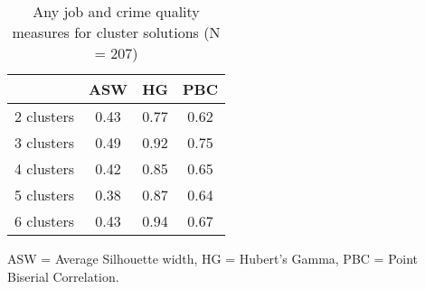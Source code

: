 \begin{table}[htp]
\footnotesize
\setlength{\tabcolsep}{35pt}
\renewcommand{\arraystretch}{1.3}
\begin{threeparttable}
\centering
\caption{Any job and crime quality measures for cluster solutions (N = 207)} 
\label{tab:quality_clusters_anyjob_crime}
\begin{tabular}{lccc}
  \hline
 & ASW & HG & PBC \\ 
  \hline
2 clusters & 0.43 & 0.77 & 0.62 \\ 
  3 clusters & 0.49 & 0.92 & 0.75 \\ 
  4 clusters & 0.42 & 0.85 & 0.65 \\ 
  5 clusters & 0.38 & 0.87 & 0.64 \\ 
  6 clusters & 0.43 & 0.94 & 0.67 \\ 
   \hline
\end{tabular}
\begin{tablenotes}
\scriptsize
\item ASW = Average Silhouette width, HG = Hubert's Gamma, PBC = Point Biserial Correlation.
\end{tablenotes}
\end{threeparttable}
\end{table}
